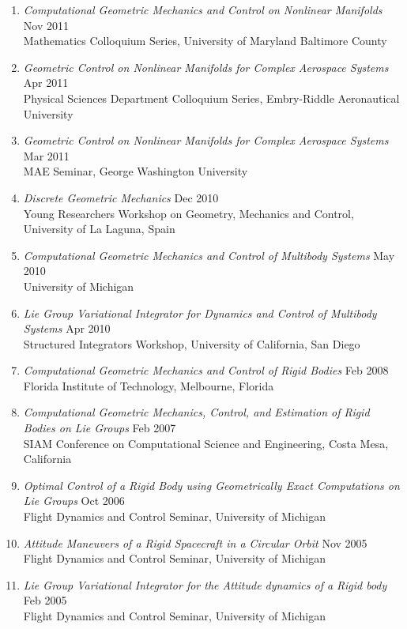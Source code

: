 \documentclass[10pt]{article}
\begin{document}
\begin{enumerate}[itemsep=2pt,parsep=2pt]
\item \textit{Computational Geometric Mechanics and Control on Nonlinear Manifolds}  \hfill Nov 2011\\
    {Mathematics Colloquium Series}, University of Maryland Baltimore County

\item \textit{Geometric Control on Nonlinear Manifolds for Complex Aerospace Systems}  \hfill Apr 2011\\
    {Physical Sciences Department Colloquium Series}, Embry-Riddle Aeronautical University

\item \textit{Geometric Control on Nonlinear Manifolds for Complex Aerospace Systems}  \hfill Mar 2011\\
    {MAE Seminar}, George Washington University

\item \textit{Discrete Geometric Mechanics}  \hfill Dec 2010\\
    {Young Researchers Workshop on Geometry, Mechanics and Control}, University of La Laguna, Spain

\item \textit{Computational Geometric Mechanics and Control of Multibody Systems}  \hfill May 2010\\
    {University of Michigan}

\item \textit{Lie Group Variational Integrator for Dynamics and Control of Multibody Systems}  \hfill Apr 2010\\
    {Structured Integrators Workshop}, University of California, San Diego

\item \textit{Computational Geometric Mechanics and Control of Rigid Bodies}  \hfill Feb 2008\\
    {Florida Institute of Technology}, Melbourne, Florida

\item \textit{Computational Geometric Mechanics, Control, and Estimation of Rigid Bodies on Lie Groups}  \hfill Feb 2007\\
    {SIAM Conference on Computational Science and Engineering}, Costa Mesa, California

\item \textit{Optimal Control of a Rigid Body using Geometrically Exact Computations on Lie Groups}  \hfill Oct 2006\\
    {Flight Dynamics and Control Seminar}, University of Michigan

\item \textit{Attitude Maneuvers of a Rigid Spacecraft in a Circular Orbit}  \hfill Nov 2005\\
    {Flight Dynamics and Control Seminar}, University of Michigan

\item \textit{Lie Group Variational Integrator for the Attitude dynamics of a Rigid body}  \hfill Feb 2005\\
    {Flight Dynamics and Control Seminar}, University of Michigan
\end{enumerate}
\end{document}
